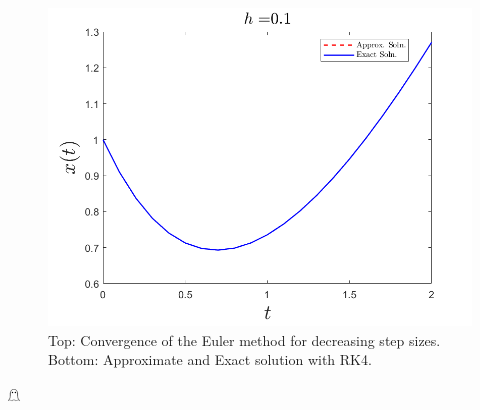 \documentclass{article}
\begin{document}
\begin{itemize}
\begin{figure}[H]
        \includegraphics[scale = 0.3]{rk4Soln.png}
        \caption{Top: Convergence of the Euler method for decreasing step sizes. Bottom: Approximate and Exact solution with RK4.}
    \end{figure}
    \hfill $\mathghost$
\end{itemize}
\end{document}
